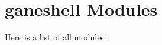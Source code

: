 \section{ganeshell Modules}
Here is a list of all modules:\begin{CompactList}
\item {}
\begin{CompactList}
\item {}
\end{CompactList}
\end{CompactList}
